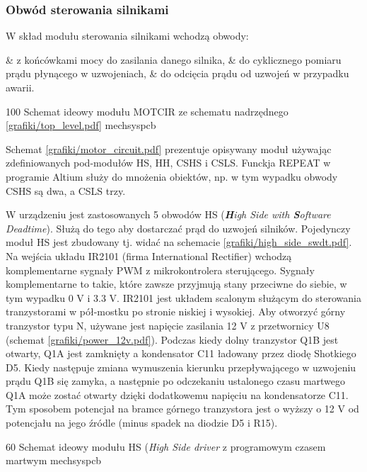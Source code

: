 \subsubsection{Obwód sterowania silnikami}

W skład modułu sterowania silnikami wchodzą obwody:

\begin{easylist}
	& z końcówkami mocy do zasilania danego silnika,
	& do cyklicznego pomiaru prądu płynącego w uzwojeniach,
	& do odcięcia prądu od uzwojeń w przypadku awarii.
\end{easylist} 

	{100}
	{Schemat ideowy modułu MOTCIR ze schematu nadrzędnego \ref{grafiki/top_level.pdf}}
	{mechsyspcb}
	
Schemat \ref{grafiki/motor_circuit.pdf} prezentuje opisywany moduł używając zdefiniowanych pod-modułów HS, HH, CSHS i CSLS. Funckja REPEAT w programie Altium służy do mnożenia obiektów, np. w tym wypadku obwody CSHS są dwa, a CSLS trzy.


W urządzeniu jest zastosowanych 5 obwodów HS (\textit{\textbf{H}igh Side with \textbf{S}oftware Deadtime}). Służą do tego aby dostarczać prąd do uzwojeń silników. Pojedynczy moduł HS jest zbudowany tj. widać na schemacie \ref{grafiki/high_side_swdt.pdf}. Na wejścia układu IR2101 (firma International Rectifier) wchodzą komplementarne sygnały PWM z mikrokontrolera sterującego. Sygnały komplementarne to takie, które zawsze przyjmują stany przeciwne do siebie, w tym wypadku 0 V i 3.3 V. IR2101 jest układem scalonym służącym do sterowania tranzystorami w pół-mostku po stronie niskiej i wysokiej. Aby otworzyć górny tranzystor typu N, używane jest napięcie zasilania 12 V z przetwornicy U8 (schemat \ref{grafiki/power_12v.pdf}). Podczas kiedy dolny tranzystor Q1B jest otwarty, Q1A jest zamknięty a kondensator C11 ładowany przez diodę Shotkiego D5. Kiedy następuje zmiana wymuszenia kierunku przepływającego w uzwojeniu prądu Q1B się zamyka, a następnie po odczekaniu ustalonego czasu martwego Q1A może zostać otwarty dzięki dodatkowemu napięciu na kondensatorze C11. Tym sposobem potencjał na bramce górnego tranzystora jest o wyższy o 12 V od potencjału na jego źródle (minus spadek na diodzie D5 i R15).

	{60}
	{Schemat ideowy modułu HS ({\it High Side driver} z programowym czasem martwym}
	{mechsyspcb}
	
